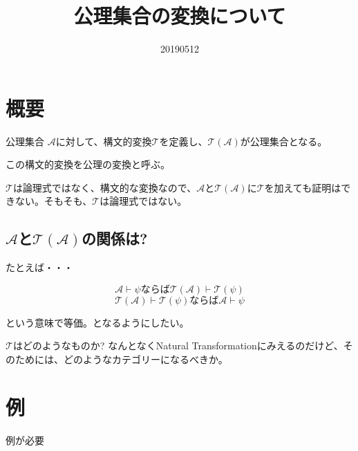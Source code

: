 \documentclass[10pt, oneside]{jarticle}   	%
\title{公理集合の変換について}
\author{\myname}
\date{20190512}							%
\begin{document}
\maketitle

\section{概要}
公理集合 $\mathcal{A}$に対して、構文的変換$\mathcal{T}$を定義し、$\mathcal{T}(\mathcal{A})$が公理集合となる。

この構文的変換を公理の変換と呼ぶ。

$\mathcal{T}$は論理式ではなく、構文的な変換なので、$\mathcal{A}$と$\mathcal{T}(\mathcal{A})$に$\mathcal{T}$を加えても証明はできない。そもそも、$\mathcal{T}$は論理式ではない。

\subsection{$\mathcal{A}$と$\mathcal{T}(\mathcal{A})$の関係は?}
たとえば・・・

$$\mathcal{A}\vdash \psi ならば \mathcal{T}(\mathcal{A}) \vdash \mathcal{T}(\psi)$$
$$\mathcal{T}(\mathcal{A}) \vdash \mathcal{T}(\psi) ならば \mathcal{A}\vdash \psi $$

という意味で等価。となるようにしたい。

$\mathcal{T}$はどのようなものか? なんとなくNatural Transformationにみえるのだけど、そのためには、どのようなカテゴリーになるべきか。

%


\section{例}
例が必要
\end{document}
